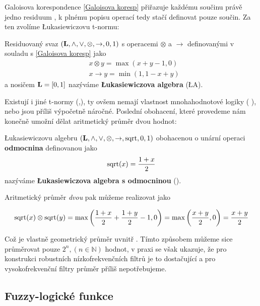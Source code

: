     Galoisova korespondence \eqref{Galoisova koresp} přiřazuje každému součinu právě jedno residuum , k plnému popisu operací tedy stačí definovat pouze součin. Za ten zvolíme \L ukasiewiczovu t-normu:
    
    \begin{define}\label{LA}
    Residuovaný svaz $(\mathbf{L},\wedge,\vee,\otimes,\rightarrow,0,1)$ s operacemi $\otimes$ a $\rightarrow$ definovanými v souladu s \eqref{Galoisova koresp} jako
    \begin{align}
    &x \otimes y = \max(x+y-1,0) \\
    &x \rightarrow y = \min(1,1-x+y)
    \end{align}
    a nosičem $\mathbf{L} = [0,1]$ nazýváme \textbf{\L ukasiewiczova algebra} \textup{(\L A)}.
    \end{define}
    
    
    Existují i jiné t-normy (\cite{MajerovaPhD},\cite{Bělíček}), ty ovšem nemají vlastnost mnohahodnotové logiky (\cite{MajerovaPhD} ), nebo jsou příliš výpočetně náročné. Poslední obohacení, které provedeme nám konečně umožní dělat aritmetický průměr dvou hodnot:
    
    \begin{define}\label{LAsqrt}
    \L ukasiewiczovu algebru $(\mathbf{L},\wedge,\vee,\otimes,\rightarrow,\mathrm{sqrt},0,1)$ obohacenou o unární operaci \textbf{odmocnina} definovanou jako
    \[
    \mathrm{sqrt}(x) = \frac{1+x}{2}
    \]
    nazýváme \textbf{\L ukasiewiczova algebra s odmocninou} \textup{(\LAsq)}.
    \end{define}
    
    Aritmetický průměr \emph{dvou} pak můžeme realizovat jako
    
    \[
    \mathrm{sqrt}(x)\otimes \mathrm{sqrt}(y) = \max\left(\frac{1+x}{2}+\frac{1+y}{2}-1,0\right) = \max\left(\frac{x+y}{2},0\right) = \frac{x+y}{2}
    \]
    
    Což je vlastně geometrický průměr uvnitř \LAsq. Tímto způsobem můžeme sice průměrovat pouze $2^n, (n \in \mathbb{N})$ hodnot, v praxi se však ukazuje, že pro konstrukci robustních nízkofrekvenčních filtrů je to dostačující a pro vysokofrekvenční filtry průměr příliš nepotřebujeme. 

    \subsection{Fuzzy-logické funkce}
    
